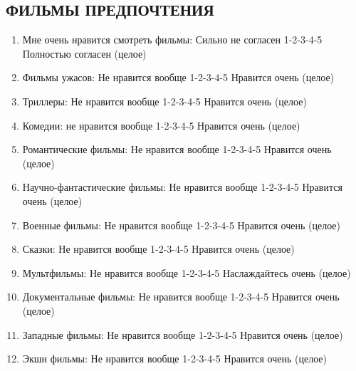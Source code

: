\documentclass[11pt]{article}
\begin{document}
\subsection{ФИЛЬМЫ ПРЕДПОЧТЕНИЯ}
\begin{enumerate}
\item Мне очень нравится смотреть фильмы: Сильно не согласен 1-2-3-4-5 Полностью согласен (целое)
\item Фильмы ужасов: Не нравится вообще 1-2-3-4-5 Нравится очень (целое)
\item Триллеры: Не нравится вообще 1-2-3-4-5 Нравится очень (целое)
\item Комедии: не нравится вообще 1-2-3-4-5 Нравится очень (целое)
\item Романтические фильмы: Не нравится вообще 1-2-3-4-5 Нравится очень (целое)
\item Научно-фантастические фильмы: Не нравится вообще 1-2-3-4-5 Нравится очень (целое)
\item Военные фильмы: Не нравится вообще 1-2-3-4-5 Нравится очень (целое)
\item Сказки: Не нравится вообще 1-2-3-4-5 Нравится очень (целое)
\item Мультфильмы: Не нравится вообще 1-2-3-4-5 Наслаждайтесь очень (целое)
\item Документальные фильмы: Не нравится вообще 1-2-3-4-5 Нравится очень (целое)
\item Западные фильмы: Не нравится вообще 1-2-3-4-5 Нравится очень (целое)
\item Экшн фильмы: Не нравится вообще 1-2-3-4-5 Нравится очень (целое)
\end{enumerate}
\end{document}
